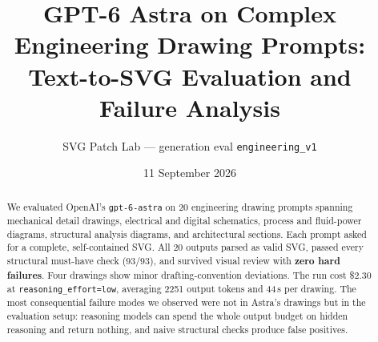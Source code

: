 \documentclass[11pt,a4paper]{article}
\title{GPT-6 Astra on Complex Engineering Drawing Prompts:\\Text-to-SVG Evaluation and Failure Analysis}
\author{SVG Patch Lab --- generation eval \texttt{engineering\_v1}}
\date{11 September 2026}
\begin{document}
\maketitle

\begin{abstract}
We evaluated OpenAI's \texttt{gpt-6-astra} on 20 engineering drawing prompts spanning mechanical detail drawings, electrical and digital schematics, process and fluid-power diagrams, structural analysis diagrams, and architectural sections. Each prompt asked for a complete, self-contained SVG. All 20 outputs parsed as valid SVG, passed every structural must-have check (93/93), and survived visual review with \textbf{zero hard failures}. Four drawings show minor drafting-convention deviations. The run cost \$2.30 at \texttt{reasoning\_effort=low}, averaging 2251 output tokens and 44\,s per drawing. The most consequential failure modes we observed were not in Astra's drawings but in the evaluation setup: reasoning models can spend the whole output budget on hidden reasoning and return nothing, and naive structural checks produce false positives.
\end{abstract}
\end{document}
